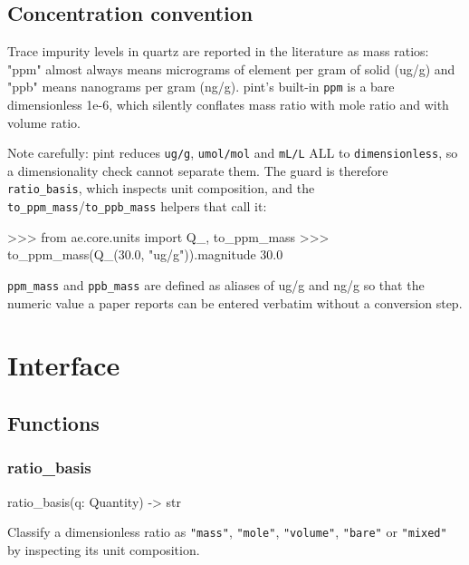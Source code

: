 \documentclass[10pt,a4paper,twoside]{report}
\begin{document}
\subsection*{Concentration convention}

Trace impurity levels in quartz are reported in the literature as mass ratios: "ppm" almost always means micrograms of element per gram of solid (ug/g) and "ppb" means nanograms per gram (ng/g). pint's built-in \texttt{ppm} is a bare dimensionless 1e-6, which silently conflates mass ratio with mole ratio and with volume ratio.

Note carefully: pint reduces \texttt{ug/g}, \texttt{umol/mol} and \texttt{mL/L} ALL to \texttt{dimensionless}, so a dimensionality check cannot separate them. The guard is therefore \texttt{ratio\_basis}, which inspects unit composition, and the \texttt{to\_ppm\_mass}/\texttt{to\_ppb\_mass} helpers that call it:

\begin{doctestblock}
>>> from ae.core.units import Q_, to_ppm_mass
>>> to_ppm_mass(Q_(30.0, "ug/g")).magnitude
30.0
\end{doctestblock}

\texttt{ppm\_mass} and \texttt{ppb\_mass} are defined as aliases of ug/g and ng/g so that the numeric value a paper reports can be entered verbatim without a conversion step.

\section{Interface}

\subsection*{Functions}

\subsubsection*{ratio\_basis}

\begin{verbatimsmall}
ratio_basis(q: Quantity) -> str
\end{verbatimsmall}

Classify a dimensionless ratio as \texttt{"mass"}, \texttt{"mole"}, \texttt{"volume"}, \texttt{"bare"} or \texttt{"mixed"} by inspecting its unit composition.
\end{document}
